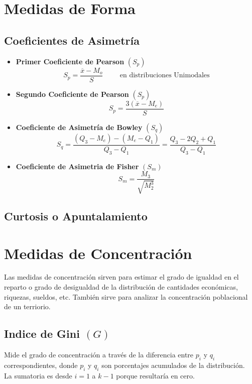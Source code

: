 \section{Medidas de Forma}
\subsection{Coeficientes de Asimetría}
\begin{itemize}
\item \textbf{Primer Coeficiente de Pearson} $(S_p)$
$$S_p=\dfrac{\overline{x}-M_o}{S} \hspace{1cm} \textrm{en distribuciones Unimodales}$$
\item \textbf{Segundo Coeficiente de Pearson} $(S_p)$
$$S_p=\dfrac{3(\overline{x}-M_e)}{S}$$
\item \textbf{Coeficiente de Asimetría de Bowley} $(S_q)$
$$S_q=\dfrac{(Q_3-M_e)-(M_e-Q_1)}{Q_3-Q_1}=\dfrac{Q_3-2Q_2+Q_1}{Q_3-Q_1}$$
\item \textbf{Coeficiente de Asimetria de Fisher} $(S_m)$
$$S_m = \dfrac{M_3}{\sqrt{M_2^3}}$$
\end{itemize}
\subsection{Curtosis o Apuntalamiento}
\begin{center}
\end{center}
\section{Medidas de Concentración}
Las medidas de concentración sirven para estimar el grado de igualdad en el reparto o grado de desigualdad de la distribución de cantidades económicas, riquezas, sueldos, etc. También sirve para analizar la concentración poblacional de un terriorio.
\subsection{Indice de Gini $(G)$}
Mide el grado de concentración a través de la diferencia entre $p_i$ y $q_i$ correspondientes, donde $p_i$ y $q_i$ son porcentajes acumulados de la distribución.\\${ }$\\La sumatoria es desde $i=1$ a $k-1$ porque resultaría en cero.

